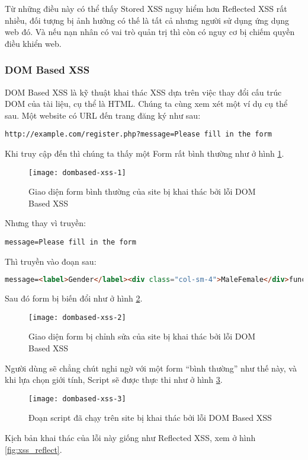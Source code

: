 \documentclass[../main-report.tex]{subfiles}
\begin{document}
Từ những điều này có thể thấy Stored XSS nguy hiểm hơn Reflected XSS rất nhiều, đối tượng bị ảnh hưởng có thế là tất cả nhưng người sử dụng ứng dụng web đó. Và nếu nạn nhân có vai trò quản trị thì còn có nguy cơ bị chiếm quyền điều khiển web.

\subsubsection*{DOM Based XSS}
DOM Based XSS là kỹ thuật khai thác XSS dựa trên việc thay đổi cấu trúc DOM của tài liệu, cụ thể là HTML. Chúng ta cùng xem xét một ví dụ cụ thể sau.
Một website có URL đến trang đăng ký như sau:

\begin{lstlisting}
http://example.com/register.php?message=Please fill in the form
\end{lstlisting}

Khi truy cập đến thì chúng ta thấy một Form rất bình thường như ở hình \ref{fig:xss_dombased_1}.

\begin{figure}[ht!]
\centering\texttt{[image: dombased-xss-1]}
\caption{Giao diện form bình thường của site bị khai thác bởi lỗi DOM Based XSS}
\label{fig:xss_dombased_1}
\end{figure}

Nhưng thay vì truyền:

\begin{lstlisting}
message=Please fill in the form
\end{lstlisting}

Thì truyền vào đoạn sau:

\begin{lstlisting}[language=HTML]
message=<label>Gender</label><div class="col-sm-4">MaleFemale</div>function show(){alert();}
\end{lstlisting}

Sau đó form bị biến đổi như ở hình \ref{fig:xss_dombased_2}.

\begin{figure}[ht!]
\centering\texttt{[image: dombased-xss-2]}
\caption{Giao diện form bị chỉnh sửa của site bị khai thác bởi lỗi DOM Based XSS}
\label{fig:xss_dombased_2}
\end{figure}

Người dùng sẽ chẳng chút nghi ngờ với một form ``bình thường'' như thế này, và khi lựa chọn giới tính, Script sẽ được thực thi như ở hình \ref{fig:xss_dombased_3}.

\begin{figure}[ht!]
\centering\texttt{[image: dombased-xss-3]}
\caption{Đoạn script đã chạy trên site bị khai thác bởi lỗi DOM Based XSS}
\label{fig:xss_dombased_3}
\end{figure}

Kịch bản khai thác của lỗi này giống như Reflected XSS, xem ở hình \ref{fig:xss_reflect}.
\end{document}
